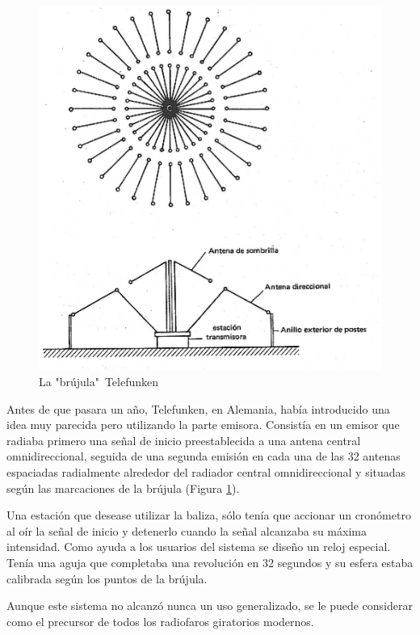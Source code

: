 \begin{figure}
  \centering  \includegraphics[keepaspectratio,width=\linewidth]{Imagenes/06.02.vor.imagenes/Telefunken.eps}
    \caption{La "br\'ujula"\, Telefunken} \label{fig:brujula.telefunken}
\end{figure}


Antes de que pasara un a\~no, Telefunken, en Alemania, hab\'ia introducido una idea muy parecida pero utilizando la parte emisora. Consist\'ia en un emisor que radiaba primero una se\~nal de inicio preestablecida a una antena central omnidireccional, seguida de una segunda emisi\'on en cada una de las 32 antenas espaciadas radialmente alrededor del radiador central omnidireccional y situadas seg\'un las marcaciones de la br\'ujula (Figura \ref{fig:brujula.telefunken}).

Una estaci\'on que desease utilizar la baliza, s\'olo ten\'ia que accionar un cron\'ometro al o\'ir la se\~nal de inicio y detenerlo cuando la se\~nal alcanzaba su m\'axima intensidad. Como ayuda a los usuarios del sistema se dise\~no un reloj especial. Ten\'ia una aguja que completaba una revoluci\'on en 32 segundos y su esfera estaba calibrada seg\'un los puntos de la br\'ujula.

Aunque este sistema no alcanz\'o nunca un uso generalizado, se le puede considerar como el precursor de todos los radiofaros giratorios modernos.

